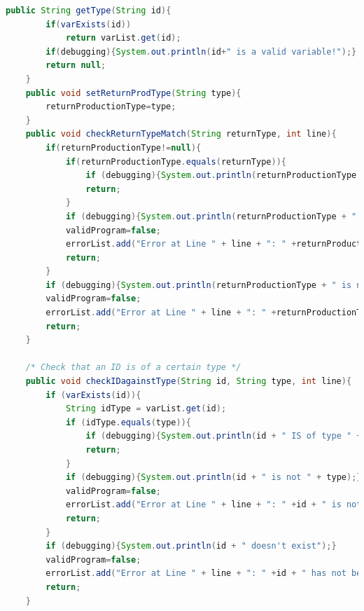 \documentclass[12pt]{report}
\begin{document}
\begin{singlespace}
\begin{lstlisting}[language=Java,label=some-code,caption={Flood$\_$Sem.java}]
	public String getType(String id){
		if(varExists(id))
			return varList.get(id);
		if(debugging){System.out.println(id+" is a valid variable!");}
		return null;
	}
	public void setReturnProdType(String type){
		returnProductionType=type;
	}
	public void checkReturnTypeMatch(String returnType, int line){
		if(returnProductionType!=null){
			if(returnProductionType.equals(returnType)){
				if (debugging){System.out.println(returnProductionType + " return type matches "+returnType);}
				return;
			}
			if (debugging){System.out.println(returnProductionType + " return type doesn't match "+returnType);}
			validProgram=false;
			errorList.add("Error at Line " + line + ": " +returnProductionType + " return type does not match "+returnType+".");
			return;
		}
		if (debugging){System.out.println(returnProductionType + " is not a valid type");}
		validProgram=false;
		errorList.add("Error at Line " + line + ": " +returnProductionType + " is not a valid type.");
		return;
	}
	
	/* Check that an ID is of a certain type */
	public void checkIDagainstType(String id, String type, int line){
		if (varExists(id)){
			String idType = varList.get(id);
			if (idType.equals(type)){
				if (debugging){System.out.println(id + " IS of type " + type);}
				return;
			}
			if (debugging){System.out.println(id + " is not " + type);}
			validProgram=false;
			errorList.add("Error at Line " + line + ": " +id + " is not of type " + type + ".");
			return;
		}
		if (debugging){System.out.println(id + " doesn't exist");}
		validProgram=false;
		errorList.add("Error at Line " + line + ": " +id + " has not been defined.");
		return;
	}
	

\end{lstlisting}
\end{singlespace}
\end{document}

